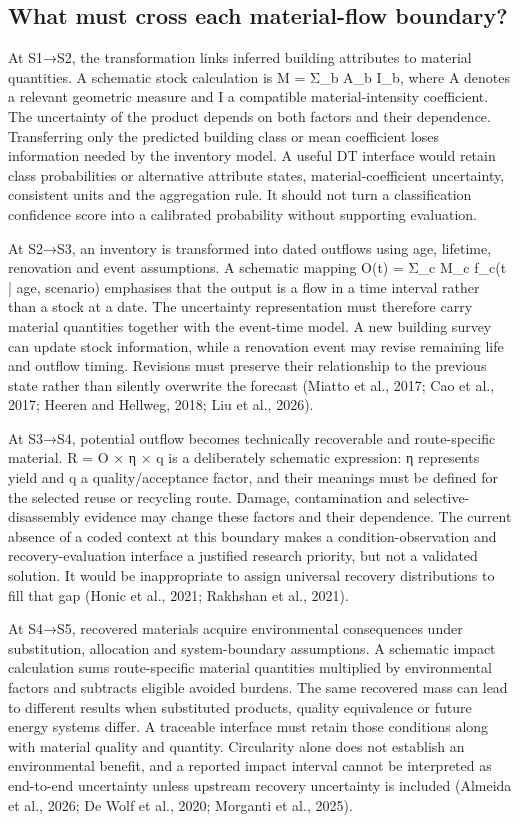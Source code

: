 \subsection{What must cross each material-flow boundary?}
At S1→S2, the transformation links inferred building attributes to material quantities. A schematic stock calculation is M = Σ\_b A\_b I\_b, where A denotes a relevant geometric measure and I a compatible material-intensity coefficient. The uncertainty of the product depends on both factors and their dependence. Transferring only the predicted building class or mean coefficient loses information needed by the inventory model. A useful DT interface would retain class probabilities or alternative attribute states, material-coefficient uncertainty, consistent units and the aggregation rule. It should not turn a classification confidence score into a calibrated probability without supporting evaluation.

At S2→S3, an inventory is transformed into dated outflows using age, lifetime, renovation and event assumptions. A schematic mapping O(t) = Σ\_c M\_c f\_c(t | age, scenario) emphasises that the output is a flow in a time interval rather than a stock at a date. The uncertainty representation must therefore carry material quantities together with the event-time model. A new building survey can update stock information, while a renovation event may revise remaining life and outflow timing. Revisions must preserve their relationship to the previous state rather than silently overwrite the forecast (Miatto et al., 2017; Cao et al., 2017; Heeren and Hellweg, 2018; Liu et al., 2026).

At S3→S4, potential outflow becomes technically recoverable and route-specific material. R = O × η × q is a deliberately schematic expression: η represents yield and q a quality/acceptance factor, and their meanings must be defined for the selected reuse or recycling route. Damage, contamination and selective-disassembly evidence may change these factors and their dependence. The current absence of a coded context at this boundary makes a condition-observation and recovery-evaluation interface a justified research priority, but not a validated solution. It would be inappropriate to assign universal recovery distributions to fill that gap (Honic et al., 2021; Rakhshan et al., 2021).

At S4→S5, recovered materials acquire environmental consequences under substitution, allocation and system-boundary assumptions. A schematic impact calculation sums route-specific material quantities multiplied by environmental factors and subtracts eligible avoided burdens. The same recovered mass can lead to different results when substituted products, quality equivalence or future energy systems differ. A traceable interface must retain those conditions along with material quality and quantity. Circularity alone does not establish an environmental benefit, and a reported impact interval cannot be interpreted as end-to-end uncertainty unless upstream recovery uncertainty is included (Almeida et al., 2026; De Wolf et al., 2020; Morganti et al., 2025).

